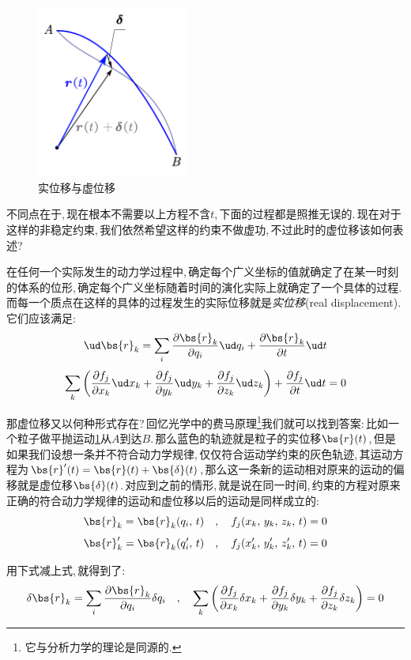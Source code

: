 \begin{figure}
\vspace{-0.8cm}
\centering
\includegraphics[width=5cm]{image/6-2-16.png}
\caption{实位移与虚位移}\label{fig:6-2-16}
\end{figure}
不同点在于,\,现在根本不需要以上方程不含$t$,\,下面的过程都是照推无误的.\,现在对于这样的非稳定约束,\,我们依然希望这样的约束不做虚功,\,不过此时的虚位移该如何表述?

在任何一个实际发生的动力学过程中,\,确定每个广义坐标的值就确定了在某一时刻的体系的位形,\,确定每个广义坐标随着时间的演化实际上就确定了一个具体的过程.\,而每一个质点在这样的具体的过程发生的实际位移就是\emph{实位移}(real displacement).\,它们应该满足:
\[\ud \bs{r}_k=\sum_i \frac{\partial \bs{r}_k}{\partial q_i}\ud q_i+\frac{\partial \bs{r}_k}{\partial t}\ud t\]
\[\sum_k\left(\frac{\partial f_j}{\partial x_k}\ud x_k+\frac{\partial f_j}{\partial y_k}\ud y_k+\frac{\partial f_j}{\partial z_k}\ud z_k\right)+\frac{\partial f_j}{\partial t}\ud t=0\]

那虚位移又以何种形式存在?\,回忆光学中的费马原理\footnote{它与分析力学的理论是同源的.}我们就可以找到答案:\,比如一个粒子做平抛运动\ref{fig:6-2-16}从$A$到达$B$.\,那么蓝色的轨迹就是粒子的实位移$\bs{r}(t)$,\,但是如果我们设想一条并不符合动力学规律,\,仅仅符合运动学约束的灰色轨迹,\,其运动方程为$\bs{r}'(t)=\bs{r}(t)+\bs{\delta}(t)$,\,那么这一条新的运动相对原来的运动的偏移就是虚位移$\bs{\delta}(t)$.\,对应到之前的情形,\,就是说在同一时间,\,约束的方程对原来正确的符合动力学规律的运动和虚位移以后的运动是同样成立的:
\[\bs{r}_k=\bs{r}_k(q_i,\,t)\quad,\quad f_j(x_k,\,y_k,\,z_k,\,t)=0\]
\[\bs{r}_k'=\bs{r}_k(q_i',\,t)\quad,\quad f_j(x_k',\,y_k',\,z_k',\,t)=0\]

用下式减上式,\,就得到了:
\[\delta \bs{r}_k=\sum_i \frac{\partial \bs{r}_k}{\partial q_i}\delta q_i\quad,\quad \sum_k\left(\frac{\partial f_j}{\partial x_k}\delta x_k+\frac{\partial f_j}{\partial y_k}\delta y_k+\frac{\partial f_j}{\partial z_k}\delta z_k\right)=0\]


